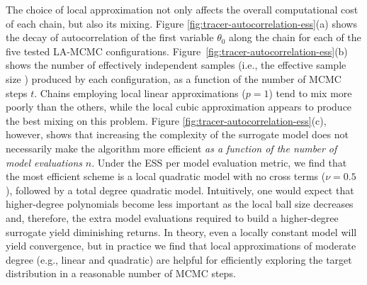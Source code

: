 
The choice of local approximation not only affects the overall computational cost of each chain, but also its mixing. Figure \ref{fig:tracer-autocorrelation-ess}(a) shows the decay of autocorrelation of the first variable $\theta_0$ along the chain for each of the five tested LA-MCMC configurations. Figure~\ref{fig:tracer-autocorrelation-ess}(b) shows the number of effectively independent samples (i.e., the effective sample size \citep{Wolffetal2004}) produced by each configuration, as a function of the number of MCMC steps $t$. Chains employing local linear approximations ($p=1$) tend to mix more poorly than the others, while the local cubic approximation appears to produce the best mixing on this problem. 
%
Figure \ref{fig:tracer-autocorrelation-ess}(c), however, shows that increasing the complexity of the surrogate model does not necessarily make the algorithm more efficient \textit{as a function of the number of model evaluations} $n$. Under the ESS per model evaluation metric, we find that the most efficient scheme is a local quadratic model with no cross terms ($\nu=0.5$), followed by a total degree quadratic model. Intuitively, one would expect that higher-degree polynomials become less important as the local ball size decreases and, therefore, the extra model evaluations required to build a higher-degree surrogate yield diminishing returns. In theory, even a locally constant model will yield convergence, but in practice we find that local approximations of moderate degree (e.g., linear and quadratic) are helpful for efficiently exploring the target distribution in a reasonable number of MCMC steps.

